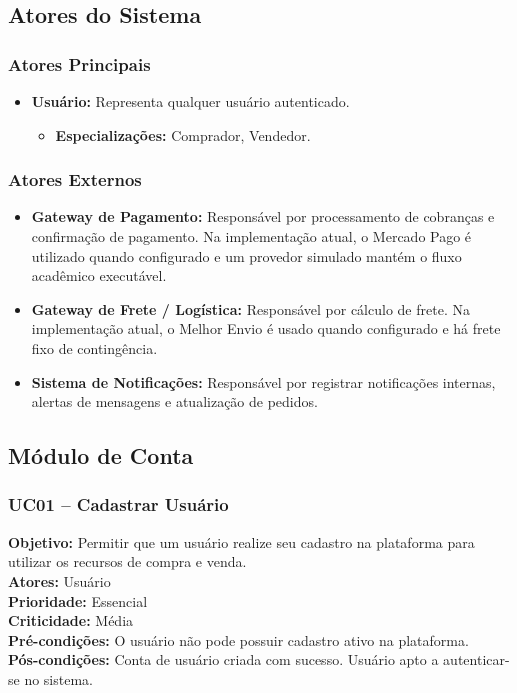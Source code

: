 ﻿\documentclass[12pt,a4paper]{article}
\begin{document}
\subsection{Atores do Sistema}
\label{sec:AtoresSistema}

\subsubsection{Atores Principais}
\begin{itemize}
    \item \textbf{Usuário:} Representa qualquer usuário autenticado.
    \begin{itemize}
        \item \textbf{Especializações:} Comprador, Vendedor.
    \end{itemize}
\end{itemize}

\subsubsection{Atores Externos}
\begin{itemize}
    \item \textbf{Gateway de Pagamento:} Responsável por processamento de cobranças e confirmação de pagamento. Na implementação atual, o Mercado Pago é utilizado quando configurado e um provedor simulado mantém o fluxo acadêmico executável.
    \item \textbf{Gateway de Frete / Logística:} Responsável por cálculo de frete. Na implementação atual, o Melhor Envio é usado quando configurado e há frete fixo de contingência.
    \item \textbf{Sistema de Notificações:} Responsável por registrar notificações internas, alertas de mensagens e atualização de pedidos.
\end{itemize}

\subsection{Módulo de Conta}

\subsubsection{UC01 – Cadastrar Usuário}
\label{uc:01}
\noindent\textbf{Objetivo:} Permitir que um usuário realize seu cadastro na plataforma para utilizar os recursos de compra e venda.\\
\textbf{Atores:} Usuário\\
\textbf{Prioridade:} Essencial\\
\textbf{Criticidade:} Média\\
\textbf{Pré-condições:} O usuário não pode possuir cadastro ativo na plataforma.\\
\textbf{Pós-condições:} Conta de usuário criada com sucesso. Usuário apto a autenticar-se no sistema.
\end{document}

